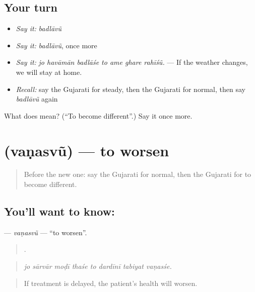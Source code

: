 \subsection*{Your turn}
\begin{itemize}
\raggedright
  \item \emph{Say it:} \emph{badlāvũ}
  \item \emph{Say it:} \emph{badlāvũ}, once more
  \item \emph{Say it:} \emph{jo havāmān badlāśe to ame ghare rahīśũ.} — If the weather changes, we will stay at home.
  \item \emph{Recall:} say the Gujarati for steady, then the Gujarati for normal, then say \emph{badlāvũ} again
\end{itemize}

\begin{tcolorbox}[breakable,colback=teal!4,colframe=teal!35!black,title={Before you move on}]
What does  mean? (\textquotedblleft{}To become different\textquotedblright{}.) Say it once more.
\end{tcolorbox}
\section[\texorpdfstring{\gu{વણસવું} (vaṇasvũ)}{વણસવું (vaṇasvũ)}]{ (vaṇasvũ) — to worsen}

\label{lesson:GU-C377-vanasvu}



\begin{quote}
Before the new one: say the Gujarati for normal, then the Gujarati for to become different.
\end{quote}

\subsection*{You'll want to know: }
\textbf{} — \emph{vaṇasvũ} — \textquotedblleft{}to worsen\textquotedblright{}.

\begin{quote}
       .
\end{quote}

\begin{quote}
\emph{jo sārvār moḍī thaśe to dardīnī tabiyat vaṇasśe.}
\end{quote}

\begin{quote}
If treatment is delayed, the patient's health will worsen.
\end{quote}

